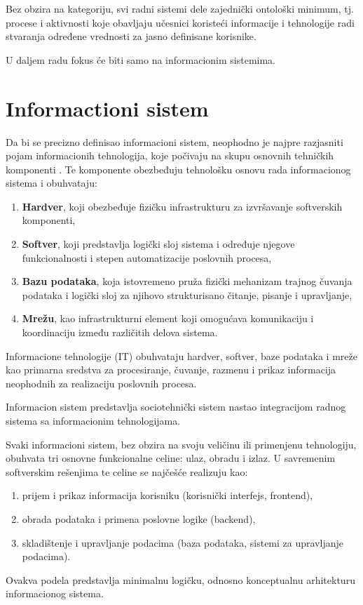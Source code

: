 Bez obzira na kategoriju, svi radni sistemi dele zajednički ontološki minimum, tj. procese i aktivnosti koje obavljaju učesnici koristeći informacije i tehnologije radi stvaranja određene vrednosti za jasno definisane korisnike.

U daljem radu fokus će biti samo na informacionim sistemima.

\section{Informactioni sistem}

Da bi se precizno definisao informacioni sistem, neophodno je najpre razjasniti pojam informacionih tehnologija, koje počivaju na skupu osnovnih tehničkih komponenti \cite{laudon2004management}. Te komponente obezbeđuju tehnološku osnovu rada informacionog sistema i obuhvataju:
\begin{enumerate}
\item \textbf{Hardver}, koji obezbeđuje fizičku infrastrukturu za izvršavanje softverskih komponenti,
\item \textbf{Softver}, koji predstavlja logički sloj sistema i određuje njegove funkcionalnosti i stepen automatizacije poslovnih procesa,
\item \textbf{Bazu podataka}, koja istovremeno pruža fizički mehanizam trajnog čuvanja podataka i logički sloj za njihovo strukturisano čitanje, pisanje i upravljanje,
\item \textbf{Mrežu}, kao infrastrukturni element koji omogućava komunikaciju i koordinaciju između različitih delova sistema.
\end{enumerate}

\begin{definicija}
Informacione tehnologije (IT) obuhvataju hardver, softver, baze podataka i mreže kao primarna sredstva za procesiranje, čuvanje, razmenu i prikaz informacija neophodnih za realizaciju poslovnih procesa.
\end{definicija}

\begin{definicija}
Informacion sistem predstavlja sociotehnički sistem nastao integracijom radnog sistema sa informacionim tehnologijama.
\end{definicija}

Svaki informacioni sistem, bez obzira na svoju veličinu ili primenjenu tehnologiju, obuhvata tri osnovne funkcionalne celine: ulaz, obradu i izlaz. U savremenim softverskim rešenjima te celine se najčešće realizuju kao:
\begin{enumerate}
\item prijem i prikaz informacija korisniku (korisnički interfejs, frontend),
\item obrada podataka i primena poslovne logike (backend),
\item skladištenje i upravljanje podacima (baza podataka, sistemi za upravljanje podacima).
\end{enumerate}
Ovakva podela predstavlja minimalnu logičku, odnosno konceptualnu arhitekturu informacionog sistema.

